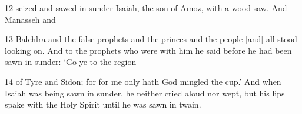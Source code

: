 \par 12 seized and sawed in sunder Isaiah, the son of Amoz, with a wood-saw. And Manasseh and

\par 13 Balchlra and the false prophets and the princes and the people [and] all stood looking on. And to the prophets who were with him he said before he had been sawn in sunder: ‘Go ye to the region

\par 14 of Tyre and Sidon; for for me only hath God mingled the cup.’ And when Isaiah was being sawn in sunder, he neither cried aloud nor wept, but his lips spake with the Holy Spirit until he was sawn in twain.

